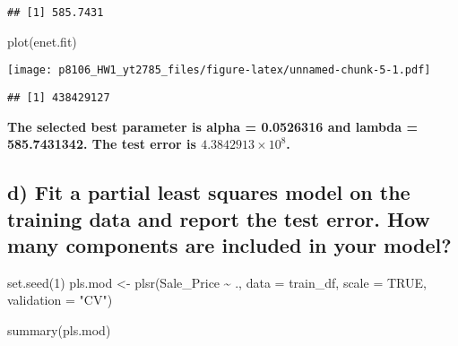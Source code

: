 \documentclass[
]{article}
\newenvironment{Shaded}{\begin{snugshade}}{\end{snugshade}}
\newcommand{\AttributeTok}[1]{\textcolor[rgb]{0.77,0.63,0.00}{#1}}
\newcommand{\CommentTok}[1]{\textcolor[rgb]{0.56,0.35,0.01}{\textit{#1}}}
\newcommand{\ConstantTok}[1]{\textcolor[rgb]{0.00,0.00,0.00}{#1}}
\newcommand{\DecValTok}[1]{\textcolor[rgb]{0.00,0.00,0.81}{#1}}
\newcommand{\FunctionTok}[1]{\textcolor[rgb]{0.00,0.00,0.00}{#1}}
\newcommand{\NormalTok}[1]{#1}
\newcommand{\OtherTok}[1]{\textcolor[rgb]{0.56,0.35,0.01}{#1}}
\newcommand{\SpecialCharTok}[1]{\textcolor[rgb]{0.00,0.00,0.00}{#1}}
\newcommand{\StringTok}[1]{\textcolor[rgb]{0.31,0.60,0.02}{#1}}
\begin{document}
\begin{verbatim}
## [1] 585.7431
\end{verbatim}

\begin{Shaded}
\begin{Highlighting}[]
\FunctionTok{plot}\NormalTok{(enet.fit)}
\end{Highlighting}
\end{Shaded}

\texttt{[image: p8106\_HW1\_yt2785\_files/figure-latex/unnamed-chunk-5-1.pdf]}

\begin{Shaded}
\end{Shaded}

\begin{verbatim}
## [1] 438429127
\end{verbatim}

\textbf{The selected best parameter is alpha = 0.0526316 and lambda =
585.7431342. The test error is \ensuremath{4.3842913\times 10^{8}}.}

\hypertarget{d-fit-a-partial-least-squares-model-on-the-training-data-and-report-the-test-error.-how-many-components-are-included-in-your-model}{%
\subsection{d) Fit a partial least squares model on the training data
and report the test error. How many components are included in your
model?}\label{d-fit-a-partial-least-squares-model-on-the-training-data-and-report-the-test-error.-how-many-components-are-included-in-your-model}}

\begin{Shaded}
\begin{Highlighting}[]
\FunctionTok{set.seed}\NormalTok{(}\DecValTok{1}\NormalTok{)}
\NormalTok{pls.mod }\OtherTok{\textless{}{-}} \FunctionTok{plsr}\NormalTok{(Sale\_Price }\SpecialCharTok{\textasciitilde{}}\NormalTok{ ., }
                \AttributeTok{data =}\NormalTok{ train\_df, }
                \AttributeTok{scale =} \ConstantTok{TRUE}\NormalTok{,  }
                \AttributeTok{validation =} \StringTok{"CV"}\NormalTok{)}

\FunctionTok{summary}\NormalTok{(pls.mod)}
\end{Highlighting}
\end{Shaded}
\end{document}
